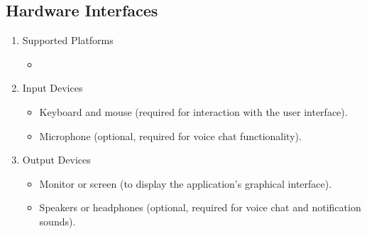 \documentclass{scrreprt}
\begin{document}
    \subsection{Hardware Interfaces}
    \begin{enumerate}
        \item Supported Platforms
            \begin{itemize}
                \item
            \end{itemize}
        \item Input Devices
            \begin{itemize}
                \item Keyboard and mouse (required for interaction with the user interface).
                \item Microphone (optional, required for voice chat functionality).
            \end{itemize}
        \item Output Devices
            \begin{itemize}
                \item Monitor or screen (to display the application’s graphical interface).
                \item Speakers or headphones (optional, required for voice chat and notification sounds).
            \end{itemize}
    \end{enumerate}
\end{document}

